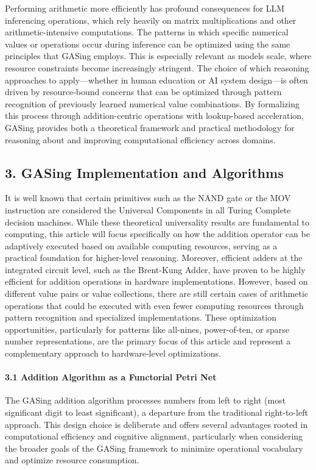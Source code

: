 Performing arithmetic more efficiently has profound consequences for LLM inferencing operations, which rely heavily on matrix multiplications and other arithmetic-intensive computations. The patterns in which specific numerical values or operations occur during inference can be optimized using the same principles that GASing employs. This is especially relevant as models scale, where resource constraints become increasingly stringent. The choice of which reasoning approaches to apply—whether in human education or AI system design—is often driven by resource-bound concerns that can be optimized through pattern recognition of previously learned numerical value combinations. By formalizing this process through addition-centric operations with lookup-based acceleration, GASing provides both a theoretical framework and practical methodology for reasoning about and improving computational efficiency across domains.

\subsection{3. GASing Implementation and Algorithms}
It is well known that certain primitives such as the NAND gate or the MOV instruction are considered the Universal Components in all Turing Complete decision machines. While these theoretical universality results are fundamental to computing, this article will focus specifically on how the addition operator can be adaptively executed based on available computing resources, serving as a practical foundation for higher-level reasoning. Moreover, efficient adders at the integrated circuit level, such as the Brent-Kung Adder, have proven to be highly efficient for addition operations in hardware implementations. However, based on different value pairs or value collections, there are still certain cases of arithmetic operations that could be executed with even fewer computing resources through pattern recognition and specialized implementations. These optimization opportunities, particularly for patterns like all-nines, power-of-ten, or sparse number representations, are the primary focus of this article and represent a complementary approach to hardware-level optimizations.

\paragraph{3.1 Addition Algorithm as a Functorial Petri Net}
The GASing addition algorithm processes numbers from left to right (most significant digit to least significant), a departure from the traditional right-to-left approach. This design choice is deliberate and offers several advantages rooted in computational efficiency and cognitive alignment, particularly when considering the broader goals of the GASing framework to minimize operational vocabulary and optimize resource consumption.

